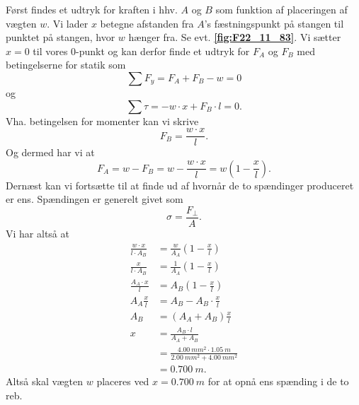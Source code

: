 \documentclass[12pt]{article}
\theoremstyle{definition}
\begin{document}
Først findes et udtryk for kraften i hhv. $A$ og $B$ som funktion af placeringen af vægten $w$. Vi lader $x$ betegne afstanden fra $A$'s fæstningspunkt på stangen til punktet på stangen, hvor $w$ hænger fra. Se evt. \textbf{\autoref{fig:F22_11_83}}. Vi sætter $x = 0$ til vores 0-punkt og kan derfor finde et udtryk for $F_A$ og $F_B$ med betingelserne for statik som
\[ 
\sum F_y = F_A + F_B - w = 0
\]
og
\[ 
\sum \tau = - w \cdot x + F_B \cdot l = 0
.\]
Vha. betingelsen for momenter kan vi skrive
\[ 
F_{B} = \frac{w \cdot x}{l}
.\]
Og dermed har vi at
\[ 
F_A = w - F_B = w - \frac{w\cdot x}{l} = w \left( 1 - \frac{x}{l} \right)
.\]
Dernæst kan vi fortsætte til at finde ud af hvornår de to spændinger produceret er ens. Spændingen er generelt givet som
\[ 
\sigma = \frac{F_{\perp}}{A}
.\]
Vi har altså at
\begin{align*}
  \frac{w\cdot x}{l \cdot A_B} &= \frac{w}{A_A} \left( 1 - \frac{x}{l} \right) \\
  \frac{x}{l\cdot A_B} &= \frac{1}{A_A} \left( 1 - \frac{x}{l} \right) \\
  \frac{A_A\cdot x}{l} &= A_B \left( 1 - \frac{x}{l} \right) \\
  A_A\frac{x}{l} &= A_B - A_B \cdot \frac{x}{l} \\
  A_B &= (A_A + A_B) \frac{x}{l} \\
  x &= \frac{A_B \cdot l}{A_A + A_B} \\
    &= \frac{\qty{4,00}{mm^2} \cdot \qty{1,05}{m}}{\qty{2,00}{mm^2} + \qty{4,00}{mm^2}} \\
    &= \qty{0,700}{m}  
.\end{align*}
Altså skal vægten $w$ placeres ved $x = \qty{0,700}{m}$ for at opnå ens spænding i de to reb. 
\end{document}
